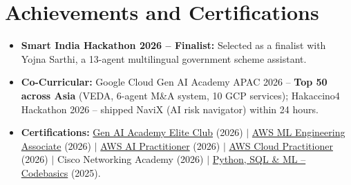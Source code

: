 \documentclass[letterpaper,11pt]{article}
\newcommand{\resumeItem}[1]{\item\small{#1\vspace{-3pt}}}
\newcommand{\resumeSubHeadingListStart}{\begin{itemize}[leftmargin=0.1in,label={},itemsep=0pt]}
\newcommand{\resumeItemListEnd}{\end{itemize}\vspace{-6pt}}
\begin{document}
\section{Achievements and Certifications}
\resumeSubHeadingListStart
\resumeItem{\textbf{Smart India Hackathon 2026 -- Finalist:} Selected as a finalist with Yojna Sarthi, a 13-agent multilingual government scheme assistant.}
  \resumeItem{\textbf{Co-Curricular:} Google Cloud Gen AI Academy APAC 2026 -- \textbf{Top 50 across Asia} (VEDA, 6-agent M\&A system, 10 GCP services); Hakaccino4 Hackathon 2026 -- shipped NaviX (AI risk navigator) within 24 hours.}
  \resumeItem{\textbf{Certifications:} \href{https://drive.google.com/file/d/1lr1ZbWqkqcvQ5TCs3ICWqWVtbm5IuFRn/view?usp=sharing}{Gen AI Academy Elite Club} (2026) $|$ \href{https://drive.google.com/file/d/1FvCa1GrTCRIaklxV0067ztgwQyjydBzg/view?usp=sharing}{AWS ML Engineering Associate} (2026) $|$ \href{https://drive.google.com/file/d/1-aNaLwvXPO3L-J9YdlBgLl24x1GVbmeu/view?usp=sharing}{AWS AI Practitioner} (2026) $|$ \href{https://drive.google.com/file/d/1e_HBagMGKM9yL-5fhBZFJIh_zbMjLt4m/view?usp=sharing}{AWS Cloud Practitioner} (2026) $|$ Cisco Networking Academy (2026) $|$ \href{https://drive.google.com/file/d/1FSc86LCHMDSydNYTsWst8bjb8L4SAGSP/view?usp=sharing}{Python, SQL \& ML -- Codebasics} (2025).}
\resumeItemListEnd
\end{document}

